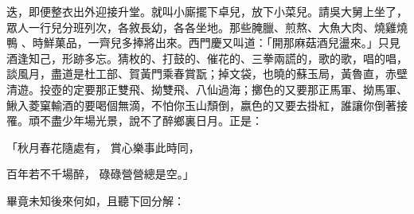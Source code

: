 迭，即便整衣出外迎接升堂。就叫小廝擺下卓兒，放下小菜兒。請吳大舅上坐了，眾人一行兒分班列次，各敘長幼，各各坐地。那些腌臘、煎熬、大魚大肉、燒雞燒鴨 、時鮮菓品，一齊兒多捧將出來。西門慶又叫道：「開那麻菇酒兒盪來。」只見酒逢知己，形跡多忘。猜枚的、打鼓的、催花的、三拳兩謊的，歌的歌，唱的唱，談風月，盡道是杜工部、賀黃門乘春賞翫；掉文袋，也曉的蘇玉局，黃魯直，赤壁清遊。投壺的定要那正雙飛、拗雙飛、八仙過海；擲色的又要那正馬軍、拗馬軍、鰍入菱窠輸酒的要喝個無滴，不怕你玉山頹倒，嬴色的又要去掛紅，誰讓你倒著接罹。頑不盡少年場光景，說不了醉鄉裏日月。正是：

「秋月春花隨處有，  賞心樂事此時同，

百年若不千場醉，  碌碌營營總是空。」

畢竟未知後來何如，且聽下回分解：

